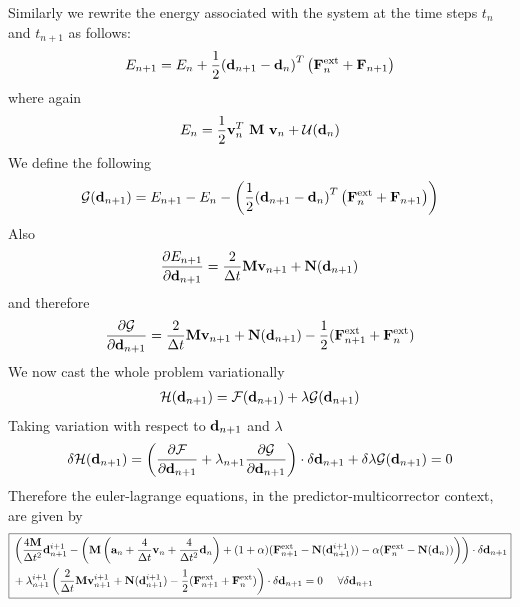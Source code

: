 Similarly we rewrite the energy associated with the system at the time steps $t_n$ and $t_{n+1}$ as follows:
\begin{align*}
E_{n+1} = E_n 
+ 
\frac{1}{2}{({\bf d}_{n+1} - {\bf d}_n )}^T \left( {\bf F}^{\rm ext}_n + {\bf F}_{n+1} \right)
\end{align*}
where again
\begin{align*}
E_{n} 
=
\frac{1}{2}{\bf v}^T_n\ {\bf M}\ {\bf v}_n + {\mathcal{U}} ({\bf d}_n)
\end{align*}
We define the following
\begin{align*}
\mathcal{G}({\bf d}_{n+1})
=
E_{n+1} - E_n 
- \left( 
\frac{1}{2}{({\bf d}_{n+1} - {\bf d}_n )}^T \left( {\bf F}^{\rm ext}_n + {\bf F}_{n+1} \right)
\right)
\end{align*}
Also
\begin{align*}
\frac{\partial {E_{n+1}}}{\partial {{\bf d}_{n+1}}}
=
\frac{2}{\Delta t}
{\bf M}
{\bf v}_{n+1}
+ 
{\bf N}({\bf d}_{n+1})
\end{align*}
and therefore
\begin{align*}
\frac{\partial {\mathcal{G}}}{\partial {{\bf d}_{n+1}}}
=
\frac{2}{\Delta t}
{\bf M}
{\bf v}_{n+1}
+ 
{\bf N}({\bf d}_{n+1})
-\frac{1}{2}({\bf F}^{\rm ext}_{n+1}+{\bf F}^{\rm ext}_{n})
\end{align*}
We now cast the whole problem variationally
\begin{align*}
\mathcal{H}
({\bf d}_{n+1})
=
\mathcal{F}({\bf d}_{n+1}) + \lambda \mathcal{G}({\bf d}_{n+1})
\end{align*}
Taking variation with respect to ${\bf d}_{n+1}$ and $\lambda$
\begin{align*}
\delta \mathcal{H}
({\bf d}_{n+1}) = \left(\frac{\partial {\mathcal{F}}}{\partial {{\bf d}_{n+1}}} 
+
 \lambda_{n+1} \frac{\partial {\mathcal{G}}}{\partial {{\bf d}_{n+1}}}\right) \cdot \delta {\bf d}_{n+1}
+ \delta \lambda \mathcal{G}({\bf d}_{n+1}) = 0
\end{align*}
Therefore the euler-lagrange equations, in the predictor-multicorrector context, are given by 
\begin{align}
\nonumber \boxed{
\begin{aligned}
& \left( 
\frac{4{\bf M}}{\Delta t^2}{\bf d}^{i+1}_{n+1}
- \left(
{\bf M}\left(
{\bf a}_n + \frac{4}{\Delta t}{\bf v}_n + \frac{4}{\Delta t^2}{\bf d}_n
\right) 
+
(1+\alpha)({\bf F}^{\rm ext}_{n+1} - {\bf N}({\bf d}^{i+1}_{n+1})) - \alpha ({\bf F}^{\rm ext}_n - {\bf N}({\bf d}_n)) 
\right)
\right) \cdot {\delta {\bf d}_{n+1}}\\
& + \lambda^{i+1}_{n+1}  \left( 
\frac{2}{\Delta t}
{\bf M}
{\bf v}^{i+1}_{n+1}
+ 
{\bf N}({\bf d}^{i+1}_{n+1})
-\frac{1}{2}({\bf F}^{\rm ext}_{n+1}+{\bf F}^{\rm ext}_{n})
\right) \cdot {\delta {\bf d}_{n+1}} = 0\ \ \ \ \forall {\delta \bf d}_{n+1}
\end{aligned}
}
\end{align}
